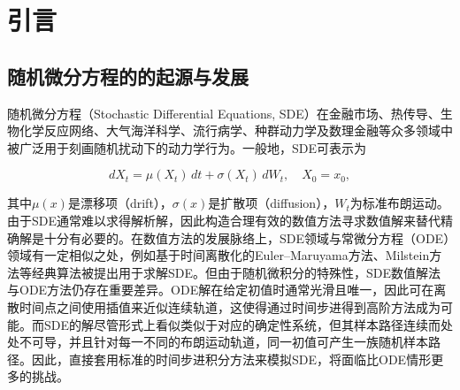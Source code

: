 	
	
	\newpage
	\pagestyle{fancy}     %
	\setcounter{page}{1}  %
	\renewcommand{\thepage}{\arabic{page}}  %
	\songti{}  %
	
	
	
	\section{引言}  %
	
	
	
	\subsection{随机微分方程的的起源与发展}
	随机微分方程（Stochastic Differential Equations, SDE）在金融市场、热传导、生物化学反应网络、大气海洋科学、流行病学、种群动力学及数理金融等众多领域中被广泛用于刻画随机扰动下的动力学行为。一般地，SDE可表示为
	
	\begin{equation}
	dX_t = \mu(X_t)\,dt + \sigma(X_t)\,dW_t, \quad X_0 = x_0,  
	\end{equation}
	
	其中\( \mu(x)\)是漂移项（drift），\(\sigma(x)\)是扩散项（diffusion），\(W_t\)为标准布朗运动。由于SDE通常难以求得解析解，因此构造合理有效的数值方法寻求数值解来替代精确解是十分有必要的。在数值方法的发展脉络上，SDE领域与常微分方程（ODE）领域有一定相似之处，例如基于时间离散化的Euler–Maruyama方法、Milstein方法等经典算法被提出用于求解SDE。但由于随机微积分的特殊性，SDE数值解法与ODE方法仍存在重要差异。ODE解在给定初值时通常光滑且唯一，因此可在离散时间点之间使用插值来近似连续轨道，这使得通过时间步进得到高阶方法成为可能。而SDE的解尽管形式上看似类似于对应的确定性系统，但其样本路径连续而处处不可导，并且针对每一不同的布朗运动轨道，同一初值可产生一族随机样本路径。因此，直接套用标准的时间步进积分方法来模拟SDE，将面临比ODE情形更多的挑战。
	
